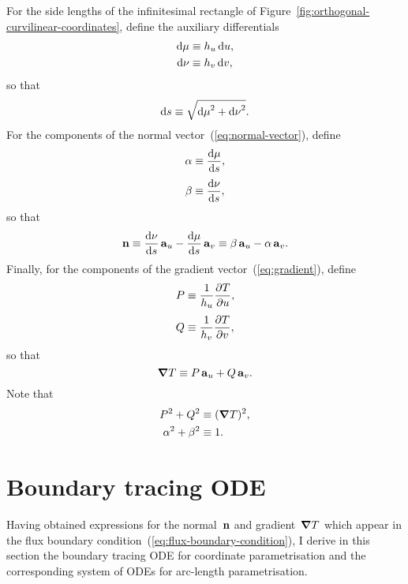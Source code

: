 For the side lengths of the infinitesimal rectangle
of Figure~\ref{fig:orthogonal-curvilinear-coordinates},
define the auxiliary differentials
\begin{align}
  \td \mu &\ideq \scalefac[u] \td u,
    \label{eq:differential-displacement-u-component} \\
  \td \nu &\ideq \scalefac[v] \td v,
    \label{eq:differential-displacement-v-component}
\end{align}
so that
\begin{equation}
  \mathop{}\!\mathrm{d} s \equiv \sqrt{{\mathop{}\!\mathrm{d} \mu}^2 + {\mathop{}\!\mathrm{d} \nu}^2}.
  \label{eq:differential-arc-length-abbreviated}
\end{equation}
For the components of the normal vector~(\ref{eq:normal-vector}),
define
\begin{align}
  \alpha &\ideq \tder{\mu}{s},
    \label{eq:tangent-u-component} \\[\tallspace]
  \beta &\ideq \tder{\nu}{s},
    \label{eq:tangent-v-component}
\end{align}
so that
\begin{equation}
  \normalvec
    \ideq \tder{\nu}{s} \basisvec{u} - \tder{\mu}{s} \basisvec{v}
    \ideq \beta \basisvec{u} - \alpha \basisvec{v}.
  \label{eq:normal-vector-abbreviated}
\end{equation}
Finally, for the components of the gradient vector~(\ref{eq:gradient}),
define
\begin{align}
  P &\ideq \frac{1}{\scalefac[u]} \pder{T}{u},
    \label{eq:gradient-u-component} \\[\tallspace]
  Q &\ideq \frac{1}{\scalefac[v]} \pder{T}{v},
    \label{eq:gradient-v-component}
\end{align}
so that
\begin{equation}
  \mathop{}\!\boldsymbol{\mathbf{\nabla}} T \equiv P \mathop{}\!\boldsymbol{\mathbf{a}}_{u} + Q \mathop{}\!\boldsymbol{\mathbf{a}}_{v}.
  \label{eq:gradient-abbreviated}
\end{equation}
Note that
\begin{align}
  P^2 + Q^2 &\equiv (\mathop{}\!\boldsymbol{\mathbf{\nabla}} T)^2, \label{eq:gradient-pythagoras} \\
  \alpha^2 + \beta^2 &\equiv 1. \label{eq:tangent-pythagoras}
\end{align}

\section{Boundary tracing ODE}
\label{sec:curvilinear.tracing}

Having obtained expressions
for the normal~$\mathop{}\!\boldsymbol{\mathbf{n}}$ and gradient~$\mathop{}\!\boldsymbol{\mathbf{\nabla}} T$
which appear in the flux boundary condition~(\ref{eq:flux-boundary-condition}),
I derive in this section
the boundary tracing ODE for coordinate parametrisation
and the corresponding system of ODEs for arc-length parametrisation.

